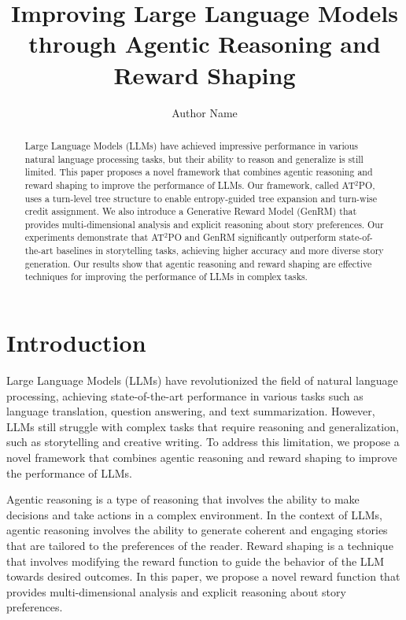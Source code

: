 \documentclass{article}
\begin{document}
\title{Improving Large Language Models through Agentic Reasoning and Reward Shaping}

\author{Author Name}

\maketitle

\begin{abstract}
Large Language Models (LLMs) have achieved impressive performance in various natural language processing tasks, but their ability to reason and generalize is still limited. This paper proposes a novel framework that combines agentic reasoning and reward shaping to improve the performance of LLMs. Our framework, called AT$^2$PO, uses a turn-level tree structure to enable entropy-guided tree expansion and turn-wise credit assignment. We also introduce a Generative Reward Model (GenRM) that provides multi-dimensional analysis and explicit reasoning about story preferences. Our experiments demonstrate that AT$^2$PO and GenRM significantly outperform state-of-the-art baselines in storytelling tasks, achieving higher accuracy and more diverse story generation. Our results show that agentic reasoning and reward shaping are effective techniques for improving the performance of LLMs in complex tasks.
\end{abstract}

\section{Introduction}
Large Language Models (LLMs) have revolutionized the field of natural language processing, achieving state-of-the-art performance in various tasks such as language translation, question answering, and text summarization. However, LLMs still struggle with complex tasks that require reasoning and generalization, such as storytelling and creative writing. To address this limitation, we propose a novel framework that combines agentic reasoning and reward shaping to improve the performance of LLMs.

Agentic reasoning is a type of reasoning that involves the ability to make decisions and take actions in a complex environment. In the context of LLMs, agentic reasoning involves the ability to generate coherent and engaging stories that are tailored to the preferences of the reader. Reward shaping is a technique that involves modifying the reward function to guide the behavior of the LLM towards desired outcomes. In this paper, we propose a novel reward function that provides multi-dimensional analysis and explicit reasoning about story preferences.
\end{document}
